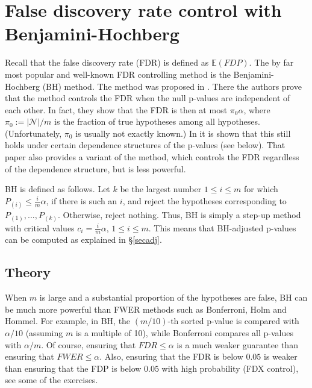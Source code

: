 \documentclass[11pt]{article}
\theoremstyle{plain}
\theoremstyle{definition}
\newcommand{\N}{\mathcal{N}}
\begin{document}

 
 
 
 
 

\newpage

\section{False discovery rate control with Benjamini-Hochberg} \label{secFDR}

Recall that the false discovery rate (FDR) is defined as $\mathbb{E}(FDP)$.
The by far  most popular and well-known FDR controlling method is the Benjamini-Hochberg (BH) method. The method was proposed in \citet{benjamini1995controlling}. There the authors prove that the method controls the FDR when the null p-values are independent of each other. In fact, they show that the FDR is then at most $\pi_0\alpha$, where $\pi_0:=|\N|/m$ is the fraction of true hypotheses among all hypotheses. (Unfortunately,  $\pi_0$ is usually not exactly known.) In \citet{benjamini2001control} it is shown that this still holds under certain dependence structures of the p-values (see below). That paper also provides a variant of the method, which controls the FDR regardless of the dependence structure, but is less powerful.

BH is defined as follows. Let $k$ be the largest number $1\leq i \leq m$ for which $P_{(i)}\leq \frac{i}{m}\alpha$, if there is such an $i$, and reject the hypotheses corresponding to $P_{(1)},...,P_{(k)}$. Otherwise, reject nothing. Thus, BH is simply a step-up method with critical values $c_i=\frac{i}{m}\alpha$,  $1\leq i \leq m$. This means that BH-adjusted p-values can be computed as explained in \S\ref{secadj}. 

\subsection{Theory}

When $m$ is large and a substantial proportion of the hypotheses are false, BH can be much more powerful than FWER methods such as Bonferroni, Holm and Hommel. For example, in BH, the $(m/10)$-th sorted p-value is compared with $\alpha/10$ (assuming $m$ is a multiple of 10), while Bonferroni compares all p-values with $\alpha/m$.
Of course, ensuring that $FDR\leq\alpha$ is a much weaker guarantee than ensuring that $FWER\leq\alpha$.
Also, ensuring  that the FDR is below $0.05$ is weaker than ensuring that the FDP is below $0.05$ with high probability (FDX control), see some of the exercises.
\end{document}
